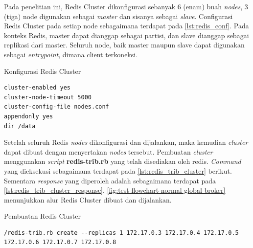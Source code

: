 Pada penelitian ini, Redis Cluster dikonfigurasi sebanyak 6 (enam) buah \textit{nodes}, 3 (tiga) node digunakan sebagai \textit{master} dan sisanya sebagai \textit{slave}. Configurasi Redis Cluster pada setiap node sebagaimana terdapat pada \autoref{lst:redis_conf}. Pada konteks Redis, master dapat dianggap sebagai partisi, dan slave dianggap sebagai replikasi dari master. Seluruh node, baik master maupun slave dapat digunakan sebagai \textit{entrypoint}, dimana client terkoneksi.


\begin{listing}[!]
	\caption{Konfigurasi Redis Cluster}
	\label{lst:redis_conf}
	\begin{verbatim}
cluster-enabled yes
cluster-node-timeout 5000
cluster-config-file nodes.conf
appendonly yes
dir /data
	\end{verbatim}
\end{listing}


Setelah seluruh Redis \textit{nodes} dikonfigurasi dan dijalankan, maka kemudian \textit{cluster} dapat dibuat dengan menyertakan \textit{nodes} tersebut. Pembuatan \textit{cluster} menggunakan \textit{script} \textbf{redis-trib.rb} yang telah disediakan oleh redis. \textit{Command} yang dieksekusi sebagaimana terdapat pada \autoref{lst:redis_trib_cluster} berikut. Sementara \textit{response} yang diperoleh adalah sebagaimana terdapat pada \autoref{lst:redis_trib_cluster_response}. \autoref{fig:test-flowchart-normal-global-broker} menunjukkan alur Redis Cluster dibuat dan dijalankan.


\begin{listing}[!]
	\caption{Pembuatan Redis Cluster}
	\label{lst:redis_trib_cluster}
	\begin{verbatim}
/redis-trib.rb create --replicas 1 172.17.0.3 172.17.0.4 172.17.0.5 172.17.0.6 172.17.0.7 172.17.0.8
	\end{verbatim}
\end{listing}


